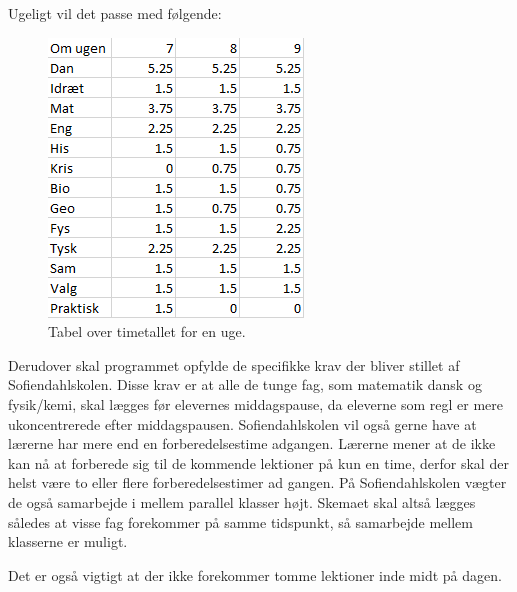 Ugeligt vil det passe med følgende:
\begin{figure}[!h]
  \centering
  \includegraphics[width=\textwidth]{partials/graphics/antalaftimerpaaenuge.png}
  \caption{Tabel over timetallet for en uge.}
  \label{fig:Timetaluge}
\end{figure}

Derudover skal programmet opfylde de specifikke krav der bliver stillet af Sofiendahlskolen. Disse krav er at alle de tunge fag, som matematik dansk og fysik/kemi, skal lægges før elevernes middagspause, da eleverne som regl er mere ukoncentrerede efter middagspausen. Sofiendahlskolen vil også gerne have at lærerne har mere end en forberedelsestime adgangen. Lærerne mener at de ikke kan nå at forberede sig til de kommende lektioner på kun en time, derfor skal der helst være to eller flere forberedelsestimer ad gangen. På Sofiendahlskolen vægter de også samarbejde i mellem parallel klasser højt. Skemaet skal altså lægges således at visse fag forekommer på samme tidspunkt, så samarbejde mellem klasserne er muligt.

Det er også vigtigt at der ikke forekommer tomme lektioner inde midt på dagen.